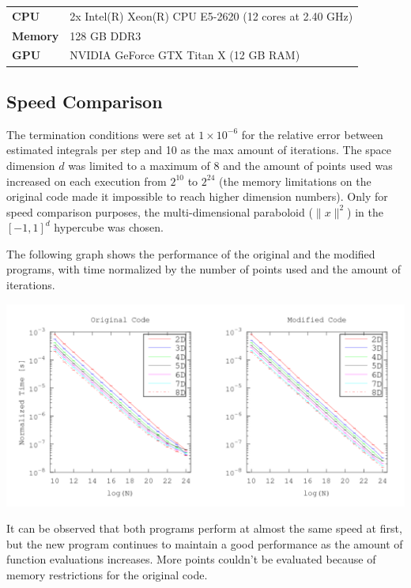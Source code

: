 \documentclass[english]{maciarticle}
\begin{document}
\begin{center}
	\begin{tabular}{ll}
		\hline
		\textbf{CPU} & 2x Intel(R) Xeon(R) CPU E5-2620 (12 cores at 2.40 GHz) \\
		\textbf{Memory} & 128 GB DDR3 \\
		\textbf{GPU} & NVIDIA GeForce GTX Titan X (12 GB RAM)\\
		\hline
	\end{tabular}
\end{center}



\subsection*{Speed Comparison}

The termination conditions were set at $1 \times 10^{-6}$ for the relative error between estimated integrals per step and 10 as the max amount of iterations. The space dimension $d$ was limited to a maximum of 8 and the amount of points used was increased on each execution from $2^{10}$ to $2^{24}$ (the memory limitations on the original code made it impossible to reach higher dimension numbers). Only for speed comparison purposes, the multi-dimensional paraboloid ($\|x\|^2$) in the $[-1,1]^d$ hypercube was chosen.

The following graph shows the performance of the original and the modified programs, with time normalized by the number of points used and the amount of iterations.

\begin{center}
	\includegraphics[width = .9\textwidth]{comparison.png}
\end{center}

It can be observed that both programs perform at almost the same speed at first, but the new program continues to maintain a good performance as the amount of function evaluations increases. More points couldn't be evaluated because of memory restrictions for the original code.
\end{document}
